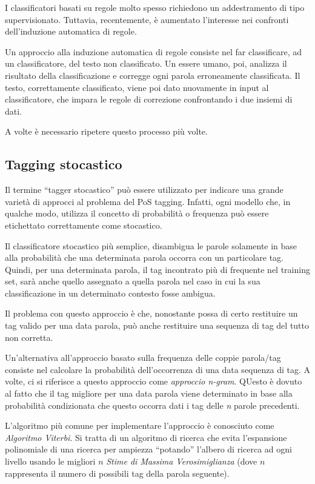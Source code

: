 I classificatori basati su regole molto spesso richiedono un addestramento di
tipo supervisionato. Tuttavia, recentemente, \`e aumentato l'interesse nei
confronti dell'induzione automatica di regole.

Un approccio alla induzione automatica di regole consiste nel far classificare,
ad un classificatore, del testo non classificato. Un essere umano, poi, analizza
il risultato della classificazione e corregge ogni parola erroneamente classificata.
Il testo, correttamente classificato, viene poi dato nuovamente in input al
classificatore, che impara le regole di correzione confrontando i due insiemi di
dati.

A volte \`e necessario ripetere questo processo pi\`u volte.

\subsection{Tagging stocastico}

Il termine ``tagger stocastico'' pu\`o essere utilizzato per indicare una grande
variet\`a di approcci al problema del PoS tagging. Infatti, ogni modello che, in
qualche modo, utilizza il concetto di probabilit\`a o frequenza pu\`o essere
etichettato correttamente come stocastico.

Il classificatore stocastico pi\`u semplice, disambigua le parole solamente in
base alla probabilit\`a che una determinata parola occorra con un particolare tag.
Quindi, per una determinata parola, il tag incontrato pi\`u di frequente nel
training set, sar\`a anche quello assegnato a quella parola nel caso in cui la
sua classificazione in un determinato contesto fosse ambigua.

Il problema con questo approccio \`e che, nonostante possa di certo restituire
un tag valido per una data parola, pu\`o anche restituire una sequenza di tag del
tutto non corretta.

Un'alternativa all'approccio basato sulla frequenza delle coppie parola/tag
consiste nel calcolare la probabilit\`a dell'occorrenza di una data sequenza di
tag. A volte, ci si riferisce a questo approccio come \emph{approccio n-gram}.
QUesto \`e dovuto al fatto che il tag migliore per una data parola viene determinato
in base alla probabilit\`a condizionata che questo occorra dati i tag delle \emph{n}
parole precedenti.

L'algoritmo pi\`u comune per implementare l'approccio \`e conosciuto come
\emph{Algoritmo Viterbi}. Si tratta di un algoritmo di ricerca che evita
l'espansione polinomiale di una ricerca per ampiezza ``potando'' l'albero di
ricerca ad ogni livello usando le migliori $n$ \emph{Stime di Massima Verosimiglianza}
(dove $n$ rappresenta il numero di possibili tag della parola seguente).


